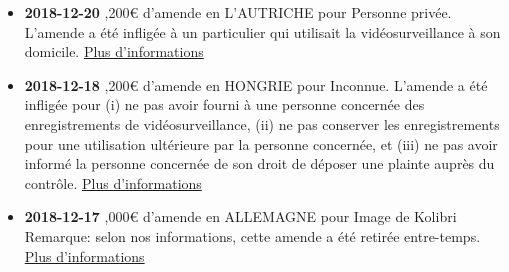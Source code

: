 \documentclass[french]{article}
\begin{document}
\newpage
\justify
	\begin{multicols}{2}
		\begin{itemize}
			\item \textbf{2018-12-20} ,200€ d'amende en L'AUTRICHE pour Personne privée.
			\newline
			L'amende a été infligée à un particulier qui utilisait la vidéosurveillance à son domicile.
			\newline
			\href{https://www.ris.bka.gv.at/Dokumente/Dsk/DSBT_20181220_DSB_D550_037_0003_DSB_2018_00/DSBT_20181220_DSB_D550_037_0003_DSB_2018_00.pdf}{Plus d'informations}
			\vspace{1cm}
	
			\item \textbf{2018-12-18} ,200€ d'amende en HONGRIE pour Inconnue.
			\newline
			L'amende a été infligée pour (i) ne pas avoir fourni à une personne concernée des enregistrements de vidéosurveillance, (ii) ne pas conserver les enregistrements pour une utilisation ultérieure par la personne concernée, et (iii) ne pas avoir informé la personne concernée de son droit de déposer une plainte auprès du contrôle.
			\newline
			\href{https://www.naih.hu/files/NAIH-2018-5559-H-hatarozat.pdf}{Plus d'informations}
			\vspace{1cm}
	
			\item \textbf{2018-12-17} ,000€ d'amende en ALLEMAGNE pour Image de Kolibri
			\newline
			Remarque: selon nos informations, cette amende a été retirée entre-temps.
			\newline
			\href{https://www.heise.de/newsticker/meldung/DSGVO-5000-Euro-Bussgeld-fuer-fehlenden-Auftragsverarbeitungsvertrag-4282737.html}{Plus d'informations}
		\end{itemize}
	\end{multicols}
\end{document}
